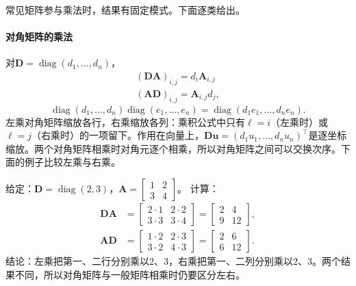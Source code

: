 常见矩阵参与乘法时，结果有固定模式。下面逐类给出。

\paragraph{对角矩阵的乘法}
对$\bm D=\operatorname{diag}(d_1,\ldots,d_n)$，
\[
 \begin{gathered}
(\bm D\bm A)_{i,j}=d_i\bm A_{i,j}\\
(\bm A\bm D)_{i,j}=\bm A_{i,j}d_j,
 \end{gathered}
\]
\[
 \operatorname{diag}(d_1,\ldots,d_n)\operatorname{diag}(e_1,\ldots,e_n)=\operatorname{diag}(d_1e_1,\ldots,d_ne_n).
\]
左乘对角矩阵缩放各行，右乘缩放各列：乘积公式中只有$\ell=i$（左乘时）或$\ell=j$（右乘时）的一项留下。作用在向量上，$\bm D\bm u=(d_1u_1,\ldots,d_nu_n)^\top$是逐坐标缩放。两个对角矩阵相乘时对角元逐个相乘，所以对角矩阵之间可以交换次序。下面的例子比较左乘与右乘。
\begin{example}[左乘与右乘对角矩阵]
\label{ex:ls-diagonal-scaling}
给定：$\bm D=\operatorname{diag}(2,3)$，$\bm A=\left[\begin{smallmatrix}1&2\\3&4\end{smallmatrix}\right]$。
计算：
\[
 \begin{aligned}
 \bm D\bm A&=\begin{bmatrix}2\cdot1&2\cdot2\\3\cdot3&3\cdot4\end{bmatrix}=\begin{bmatrix}2&4\\9&12\end{bmatrix},\\
 \bm A\bm D&=\begin{bmatrix}1\cdot2&2\cdot3\\3\cdot2&4\cdot3\end{bmatrix}=\begin{bmatrix}2&6\\6&12\end{bmatrix}.
 \end{aligned}
\]
结论：左乘把第一、二行分别乘以$2$、$3$，右乘把第一、二列分别乘以$2$、$3$。两个结果不同，所以对角矩阵与一般矩阵相乘时仍要区分左右。
\end{example}

